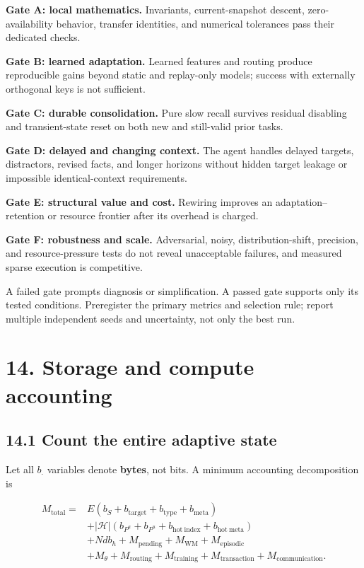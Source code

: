 \documentclass[
  11pt,
  a4paper,
]{article}
\begin{document}
\textbf{Gate A: local mathematics.} Invariants, current-snapshot
descent, zero-availability behavior, transfer identities, and numerical
tolerances pass their dedicated checks.

\textbf{Gate B: learned adaptation.} Learned features and routing
produce reproducible gains beyond static and replay-only models; success
with externally orthogonal keys is not sufficient.

\textbf{Gate C: durable consolidation.} Pure slow recall survives
residual disabling and transient-state reset on both new and still-valid
prior tasks.

\textbf{Gate D: delayed and changing context.} The agent handles delayed
targets, distractors, revised facts, and longer horizons without hidden
target leakage or impossible identical-context requirements.

\textbf{Gate E: structural value and cost.} Rewiring improves an
adaptation--retention or resource frontier after its overhead is
charged.

\textbf{Gate F: robustness and scale.} Adversarial, noisy,
distribution-shift, precision, and resource-pressure tests do not reveal
unacceptable failures, and measured sparse execution is competitive.

A failed gate prompts diagnosis or simplification. A passed gate
supports only its tested conditions. Preregister the primary metrics and
selection rule; report multiple independent seeds and uncertainty, not
only the best run.

\section{14. Storage and compute
accounting}\label{storage-and-compute-accounting}

\subsection{14.1 Count the entire adaptive
state}\label{count-the-entire-adaptive-state}

Let all \(b_\cdot\) variables denote \textbf{bytes}, not bits. A minimum
accounting decomposition is

\[
\begin{aligned}
M_{\mathrm{total}}={}&E(b_S+b_{\mathrm{target}}+b_{\mathrm{type}}+b_{\mathrm{meta}})\\
&+|\mathcal H|(b_{P^a}+b_{P^u}+b_{\mathrm{hot\ index}}+b_{\mathrm{hot\ meta}})\\
&+Ndb_h+M_{\mathrm{pending}}+M_{\mathrm{WM}}+M_{\mathrm{episodic}}\\
&+M_\theta+M_{\mathrm{routing}}+M_{\mathrm{training}}
+M_{\mathrm{transaction}}+M_{\mathrm{communication}}.
\end{aligned}
\tag{35}
\]
\end{document}
